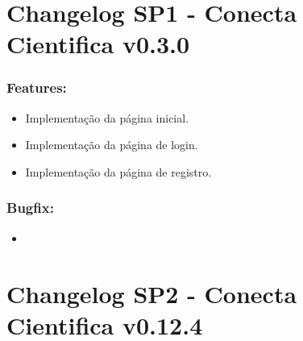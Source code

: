 \documentclass[
40pt,				%
openright,			%
oneside,			%
a4paper,			%
chapter=TITLE,		%
sumario=tradicional,
english,			%
]{abntex2}
\begin{document}
	
	
	\frenchspacing 
	
	\pretextual
	
	\textual
	\pagestyle{meuestilo}
	
	\chapter*{Changelog SP1 - Conecta Cientifica v0.3.0} 
	
	\subsection*{\textbf{Features:}}
	\begin{itemize} \setlength\itemsep{0em}
		
		\item Implementação da página inicial.
		\item Implementação da página de login.
		\item Implementação da página de registro.

	\end{itemize}

	\subsection*{\textbf{Bugfix:}}
	\begin{itemize} \setlength\itemsep{0em}

		\item   

	\end{itemize}


	

	\chapter*{Changelog SP2 - Conecta Cientifica v0.12.4} 
	
\end{document}

